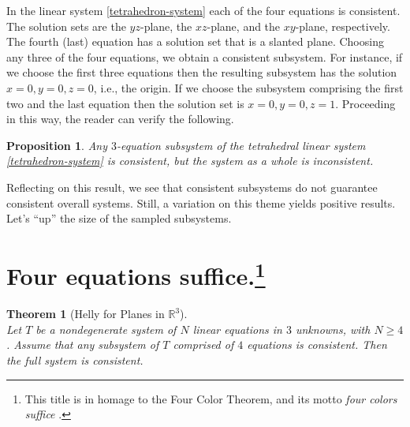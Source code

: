 \documentclass[11pt]
{amsart}
\newtheorem{theorem}{Theorem}
\newtheorem*{proposition}{Proposition}
\begin{document}
In the linear system \eqref{tetrahedron-system} each of the four equations is consistent. The solution sets are the $yz$-plane, the $xz$-plane, and the $xy$-plane, respectively.  The fourth (last) equation has a solution set that is a slanted plane. Choosing any three of the four equations, we obtain a consistent subsystem. For instance, if we choose the first three equations then the resulting subsystem has the solution $x=0,y=0,z=0$, i.e., the origin.  If we choose the subsystem comprising the first two and the last equation then the solution set is  $x=0,y=0,z=1$. Proceeding in this way, the reader can verify the following.

\begin{proposition}
Any $3$-equation subsystem of the tetrahedral  linear system \eqref{tetrahedron-system} is consistent, but the system as a whole is inconsistent.
\end{proposition}

Reflecting on this result, we see that consistent subsystems do not guarantee consistent overall systems. Still, a variation on this theme yields positive results. Let's  ``up'' the size of the sampled subsystems. 

\section[Four equations suffice]{Four equations suffice.\protect\footnote{This title is in homage to the Four Color Theorem, and its motto \emph{four colors suffice} \cite{Wilson13}.}}



\begin{theorem}[Helly for Planes in $\mathbb R^3$] \, \\
Let $T$ be a nondegenerate  system of $N$ linear equations in $3$ unknowns, with $N \ge 4$. Assume that any subsystem of $T$ comprised of $4$ equations is consistent. Then the full system is consistent.
\end{theorem}
\end{document}
